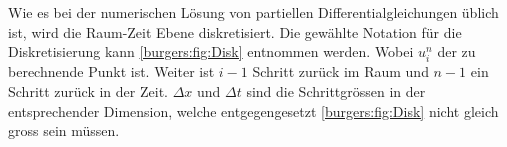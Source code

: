      Wie es bei der numerischen L\"osung von partiellen Differentialgleichungen \"ublich ist, wird die Raum-Zeit Ebene  diskretisiert.
     Die gew\"ahlte Notation f\"ur die Diskretisierung kann \autoref{burgers:fig:Disk} entnommen werden.
     Wobei $u_i^n$ der zu berechnende Punkt ist.
     Weiter ist $i-1$ Schritt zur\"uck im Raum und $n-1$ ein Schritt zur\"uck in der Zeit.
     $\Delta x$ und $\Delta t$ sind die Schrittgr\"ossen in der entsprechender Dimension, welche entgegengesetzt \autoref{burgers:fig:Disk} nicht gleich gross sein m\"ussen.
